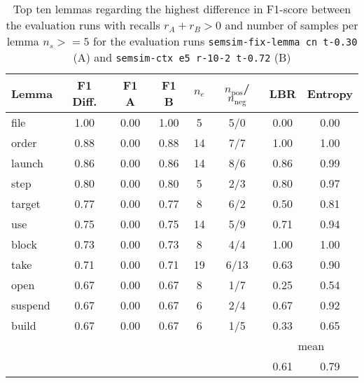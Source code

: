 \documentclass[11pt]{scrreprt}
\begin{document}
\begin{table}[p]
\centering
\begin{tabular}{lccccccc}
\toprule
Lemma      & F1 Diff. & F1 A & F1 B & \(n_e\) & \(n_\text{pos}\)/\(n_\text{neg}\) & LBR & Entropy \\
\midrule
file       & 1.00      & 0.00           & 1.00           & 5               & 5/0     & 0.00 & 0.00 \\
order      & 0.88      & 0.00           & 0.88           & 14              & 7/7     & 1.00 & 1.00 \\
launch     & 0.86      & 0.00           & 0.86           & 14              & 8/6     & 0.86 & 0.99 \\
step       & 0.80      & 0.00           & 0.80           & 5               & 2/3     & 0.80 & 0.97 \\
target     & 0.77      & 0.00           & 0.77           & 8               & 6/2     & 0.50 & 0.81 \\
use        & 0.75      & 0.00           & 0.75           & 14              & 5/9     & 0.71 & 0.94 \\
block      & 0.73      & 0.00           & 0.73           & 8               & 4/4     & 1.00 & 1.00 \\
take       & 0.71      & 0.00           & 0.71           & 19              & 6/13    & 0.63 & 0.90 \\
open       & 0.67      & 0.00           & 0.67           & 8               & 1/7     & 0.25 & 0.54 \\
suspend    & 0.67      & 0.00           & 0.67           & 6               & 2/4     & 0.67 & 0.92 \\
build      & 0.67      & 0.00           & 0.67           & 6               & 1/5     & 0.33 & 0.65 \\
\cmidrule{7-8}
\multicolumn{6}{l}{} & \multicolumn{2}{c}{mean} \\
\multicolumn{6}{l}{} & 0.61 & 0.79 \\
\bottomrule
\end{tabular}
\caption{Top ten lemmas regarding the highest difference in F1-score between the evaluation runs with recalls \(r_A + r_B > 0\) and number of samples per lemma \(n_s >= 5\) for the evaluation runs \texttt{semsim-fix-lemma cn t-0.30} (A) and \texttt{semsim-ctx e5 r-10-2 t-0.72} (B)}
\label{tab:predicate-lemma-highest-f1}
\end{table}
\end{document}
